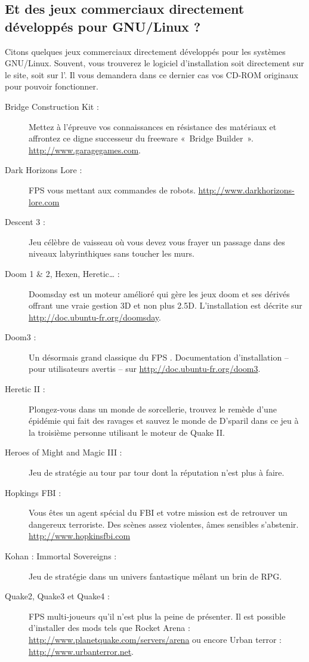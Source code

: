 \subsection{Et des jeux commerciaux directement développés pour GNU/Linux ?}
Citons quelques jeux commerciaux directement développés pour les systèmes GNU/Linux. Souvent, vous trouverez le logiciel d'installation soit directement sur le site, soit sur l'. Il vous demandera dans ce dernier cas vos CD-ROM originaux pour pouvoir fonctionner.\par
\begin{description}
\item[Bridge Construction Kit :] Mettez à l'épreuve vos connaissances en résistance des matériaux et affrontez ce digne successeur du freeware «~Bridge Builder~». \url{http://www.garagegames.com}.
\item[Dark Horizons Lore :] FPS vous mettant aux commandes de robots. \url{http://www.darkhorizons-lore.com}
\item[Descent 3 :] Jeu célèbre de vaisseau où vous devez vous frayer un passage dans des niveaux labyrinthiques sans toucher les murs.
\item[Doom 1 \& 2, Hexen, Heretic\ldots{} :] Doomsday est un moteur amélioré qui gère les jeux doom et ses dérivés offrant une vraie gestion 3D et non plus 2.5D. L'installation est décrite sur \url{http://doc.ubuntu-fr.org/doomsday}.
\item[Doom3 :] Un désormais grand classique du FPS . Documentation d'installation -- pour utilisateurs avertis -- sur \url{http://doc.ubuntu-fr.org/doom3}.
\item[Heretic II :] Plongez-vous dans un monde de sorcellerie, trouvez le remède d'une épidémie qui fait des ravages et sauvez le monde de D'sparil dans ce jeu à la troisième personne utilisant le moteur de Quake II.
\item[Heroes of Might and Magic III :] Jeu de stratégie au tour par tour dont la réputation n'est plus à faire.
\item[Hopkings FBI :] Vous êtes un agent spécial du FBI et votre mission est de retrouver un dangereux terroriste. Des scènes assez violentes, âmes sensibles s'abstenir. \url{http://www.hopkinsfbi.com}
\item[Kohan : Immortal Sovereigns :] Jeu de stratégie dans un univers fantastique mêlant un brin de RPG.
\item[Quake2, Quake3 et Quake4 :] FPS multi-joueurs qu'il n'est plus la peine de présenter. Il est possible d'installer des mods tels que Rocket Arena : \url{http://www.planetquake.com/servers/arena} ou encore Urban terror : \url{http://www.urbanterror.net}.

\end{description}
